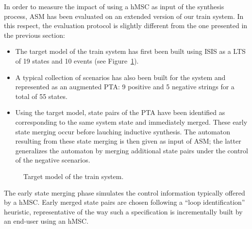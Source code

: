 In order to measure the impact of using a hMSC as input of the synthesis process, ASM has been evaluated on an extended version of our train system. In this respect, the evaluation protocol is slightly different from the one presented in the previous section: 
\begin{itemize}
\item The target model of the train system has first been built using ISIS as a LTS of 19 states and 10 events (see Figure~\ref{image:case-studies-big-train-2}). 
\item A typical collection of scenarios has also been built for the system and represented as an augmented PTA: 9 positive and 5 negative strings for a total of 55 states.
\item Using the target model, state pairs of the PTA have been identified as corresponding to the same system state and immediately merged. These early state merging occur before lauching inductive synthesis. The automaton resulting from these state merging is then given as input of ASM; the latter generalizes the automaton by merging additional state pairs under the control of the negative scenarios.
\end{itemize}

\begin{figure}[H]
\centering
{}
\caption{Target model of the train system.\label{image:case-studies-big-train-2}}
\end{figure}

The early state merging phase simulates the control information typically offered by a hMSC. Early merged state pairs are chosen following a ``loop identification'' heuristic, representative of the way such a specification is incrementally built by an end-user using an hMSC. 


